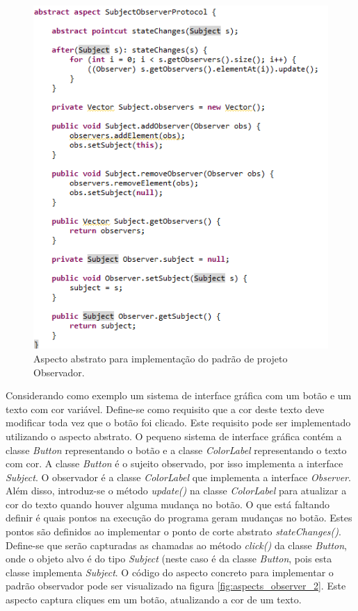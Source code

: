 \begin{figure}
	\centering
	\includegraphics{img/aspects_observer_1.png}
	\caption{Aspecto abstrato para implementação do
	padrão de projeto Observador.}\label{fig:aspects_observer_1}
\end{figure}

Considerando como exemplo um sistema de interface gráfica com um botão e um
texto com cor variável. Define-se como requisito que a cor deste texto deve modificar toda vez
que o botão foi clicado. Este requisito pode ser implementado utilizando o
aspecto abstrato. O pequeno sistema de interface gráfica contém a classe
\textit{Button} representando o botão e a classe \textit{ColorLabel}
representando o texto com cor. A classe \textit{Button} é o sujeito observado,
por isso implementa a interface \textit{Subject}. O observador é a classe
\textit{ColorLabel} que implementa a interface \textit{Observer}. Além disso,
introduz-se o método \textit{update()} na classe \textit{ColorLabel} para
atualizar a cor do texto quando houver alguma mudança no botão. O que está
faltando definir é quais pontos na execução do programa geram mudanças no botão.
Estes pontos são definidos ao implementar o ponto de corte abstrato
\textit{stateChanges()}. Define-se que serão capturadas as chamadas ao método
\textit{click()} da classe \textit{Button}, onde o objeto alvo é do tipo
\textit{Subject} (neste caso é da classe \textit{Button}, pois esta classe
implementa \textit{Subject}. O código do aspecto concreto para implementar o
padrão observador pode ser visualizado na figura \ref{fig:aspects_observer_2}. 
Este aspecto captura cliques em um botão, atualizando a cor de um texto.

